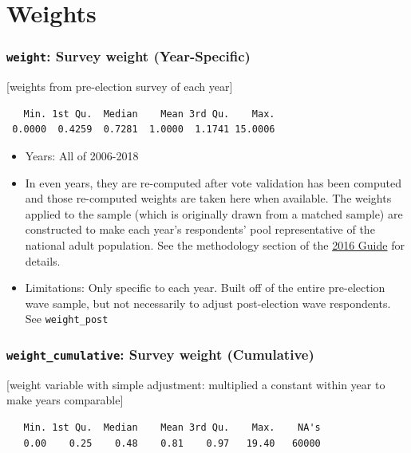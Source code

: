 \documentclass[10pt,article,oneside]{memoir}
\theoremstyle{definition}
\begin{document}
\hypertarget{weights}{%
\section{Weights}\label{weights}}

\hypertarget{weight-survey-weight-year-specific}{%
\subsubsection{\texorpdfstring{\texttt{weight}: Survey weight
(Year-Specific)}{weight: Survey weight (Year-Specific)}}\label{weight-survey-weight-year-specific}}

{[}weights from pre-election survey of each year{]}

\begin{verbatim}
   Min. 1st Qu.  Median    Mean 3rd Qu.    Max. 
 0.0000  0.4259  0.7281  1.0000  1.1741 15.0006 
\end{verbatim}

\begin{itemize}
\tightlist
\item
  Years: All of 2006-2018
\item
  In even years, they are re-computed after vote validation has been
  computed and those re-computed weights are taken here when available.
  The weights applied to the sample (which is originally drawn from a
  matched sample) are constructed to make each year's respondents' pool
  representative of the national adult population. See the methodology
  section of the
  \href{https://dataverse.harvard.edu/api/access/datafile/3047286}{2016
  Guide} for details.
\item
  Limitations: Only specific to each year. Built off of the entire
  pre-election wave sample, but not necessarily to adjust post-election
  wave respondents. See \texttt{weight\_post}
\end{itemize}

\hypertarget{weight_cumulative-survey-weight-cumulative}{%
\subsubsection{\texorpdfstring{\texttt{weight\_cumulative}: Survey
weight
(Cumulative)}{weight\_cumulative: Survey weight (Cumulative)}}\label{weight_cumulative-survey-weight-cumulative}}

{[}weight variable with simple adjustment: multiplied a constant within
year to make years comparable{]}

\begin{verbatim}
   Min. 1st Qu.  Median    Mean 3rd Qu.    Max.    NA's 
   0.00    0.25    0.48    0.81    0.97   19.40   60000 
\end{verbatim}
\end{document}
